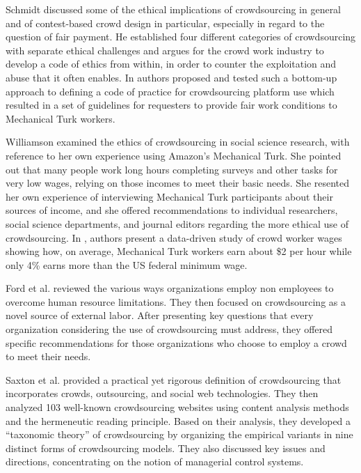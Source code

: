 \documentclass[11pt]{article}
\begin{document}
Schmidt \cite{schmidt2013good} discussed some of the ethical implications of crowdsourcing in general and of contest-based crowd design in particular, especially in regard to the question of fair payment. He established four different categories of crowdsourcing with separate ethical challenges and argues for the crowd work industry to develop a code of ethics from within, in order to counter the exploitation and abuse that it often enables.
% 
In \cite{dynamo} authors proposed and tested such a bottom-up approach to defining a code of practice for crowdsourcing platform use which resulted in a set of guidelines for requesters to provide fair work conditions to Mechanical Turk workers.

Williamson \cite{williamson2016ethics} examined the ethics of crowdsourcing in social science research, with reference to her own experience using Amazon’s Mechanical Turk. She pointed out that many people work long hours completing surveys and other tasks for very low wages, relying on those incomes to meet their basic needs. She resented her own experience of interviewing Mechanical Turk participants about their sources of income, and she offered recommendations to individual researchers, social science departments, and journal editors regarding the more ethical use of crowdsourcing.
% 
In \cite{earnings}, authors present a data-driven study of crowd worker wages showing how, on average, Mechanical Turk workers earn about \$2 per hour while only 4\% earns more than the US federal minimum wage.

Ford et al. \cite{ford2015crowdsourcing}  reviewed the various ways organizations employ non employees to overcome human resource limitations. They then focused on crowdsourcing as a novel source of external labor. After presenting key questions that every organization considering the use of crowdsourcing must address, they offered specific recommendations for those organizations who choose to employ a crowd to meet their needs. 

Saxton et al. \cite{saxton2013rules} provided a practical yet rigorous definition of crowdsourcing that incorporates crowds, outsourcing, and social web technologies. They then analyzed 103 well-known crowdsourcing websites using content analysis methods and the hermeneutic reading principle. Based on their analysis, they developed a ``taxonomic theory'' of crowdsourcing by organizing the empirical variants in nine distinct forms of crowdsourcing models. They also discussed key issues and directions, concentrating on the notion of managerial control systems.
\end{document}
